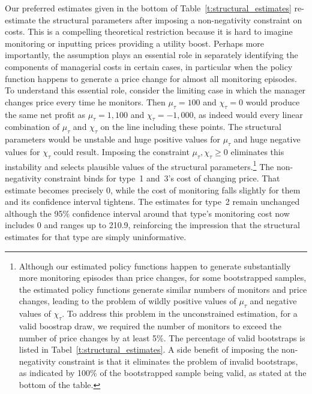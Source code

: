 \documentclass[11pt]{article}
\begin{document}
\begin{spacing}{1.3}
Our preferred estimates given in the bottom of
Table~\ref{t:structural_estimates} re-estimate the structural
parameters after imposing a non-negativity constraint on costs. This
is a compelling theoretical restriction because it is hard to imagine
monitoring or inputting prices providing a utility boost. Perhaps more
importantly, the assumption plays an essential role in separately
identifying the components of managerial costs in certain cases, in
particular when the policy function happens to generate a price change
for almost all monitoring episodes. To understand this essential role,
consider the limiting case in which the manager changes price every
time he monitors. Then $\mu_\tau = 100$ and $\chi_\tau = 0$ would
produce the same net profit as $\mu_\tau = 1,100$ and $\chi_\tau =
-1,000$, as indeed would every linear combination of $\mu_\tau$ and
$\chi_\tau$ on the line including these points. The structural
parameters would be unstable and huge positive values for $\mu_\tau$
and huge negative values for $\chi_\tau$ could result. Imposing the
constraint $\mu_\tau, \chi_\tau \geq 0$ eliminates this instability
and selects plausible values of the structural
parameters.\footnote{Although our estimated policy functions happen to
  generate substantially more monitoring episodes than price changes,
  for some bootstrapped samples, the estimated policy functions
  generate similar numbers of monitors and price changes, leading to
  the problem of wildly positive values of $\mu_\tau$ and negative
  values of $\chi_\tau$. To address this problem in the unconstrained
  estimation, for a valid boostrap draw, we required the number of
  monitors to exceed the number of price changes by at least 5\%. The
  percentage of valid bootstraps is listed in
  Tabel~\ref{t:structural_estimates}. A side benefit of imposing the
  non-negativity constraint is that it eliminates the problem of
  invalid bootstraps, as indicated by 100\% of the bootstrapped sample
  being valid, as stated at the bottom of the table.}  The
non-negativity constraint binds for type~1 and~3's cost of changing
price. That estimate becomes precisely 0, while the cost of monitoring
falls slightly for them and its confidence interval tightens. The
estimates for type~2 remain unchanged although the 95\% confidence
interval around that type's monitoring cost now includes 0 and ranges
up to 210.9, reinforcing the impression that the structural estimates
for that type are simply uninformative.



\end{spacing}
\end{document}
